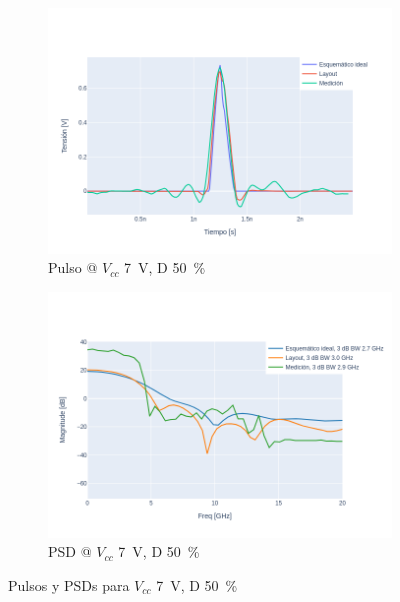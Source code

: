 \begin{figure}[t!]
    \centering
    \begin{subfigure}[b]{0.49\textwidth}
        \centering
        \includegraphics[width=\textwidth]{images/plots/Vcc_7V_duty_50_time_domain.png}
        \caption{Pulso @ $V_{cc}$ \qty{7}{\volt}, D \qty{50}{\percent} }
        \label{fig:pulses_7v_50}
    \end{subfigure}
    \hfill
    \begin{subfigure}[b]{0.49\textwidth}
        \centering
        \includegraphics[width=\textwidth]{images/plots/Vcc_7V_duty_50_psd.png}
        \caption{PSD @ $V_{cc}$ \qty{7}{\volt}, D \qty{50}{\percent} }
        \label{fig:psd_7v_50}
    \end{subfigure}
    \caption{Pulsos y PSDs para $V_{cc}$ \qty{7}{\volt}, D \qty{50}{\percent} }
    \label{fig:plots_7v_50}
\end{figure}


